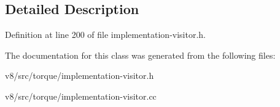\subsection{Detailed Description}


Definition at line 200 of file implementation-\/visitor.\+h.



The documentation for this class was generated from the following files\+:\begin{DoxyCompactItemize}
\item 
v8/src/torque/implementation-\/visitor.\+h\item 
v8/src/torque/implementation-\/visitor.\+cc\end{DoxyCompactItemize}
